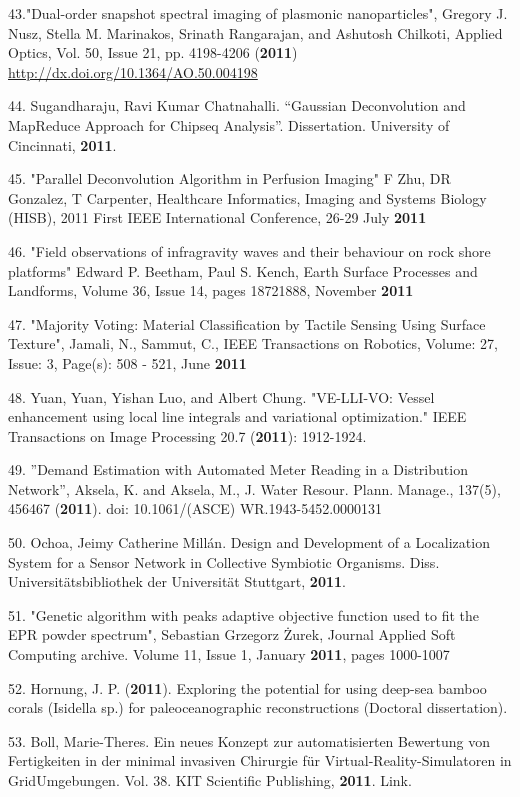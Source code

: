 43."Dual-order snapshot spectral imaging of plasmonic nanoparticles", Gregory J. Nusz, Stella M. Marinakos, Srinath Rangarajan, and Ashutosh Chilkoti, Applied Optics, Vol. 50, Issue 21, pp. 4198-4206 (\textbf{2011}) \url{http://dx.doi.org/10.1364/AO.50.004198}

44. Sugandharaju, Ravi Kumar Chatnahalli. ``Gaussian Deconvolution and MapReduce Approach for Chipseq Analysis''. Dissertation. University of Cincinnati, \textbf{2011}.

45. "Parallel Deconvolution Algorithm in Perfusion Imaging" F Zhu, DR Gonzalez, T Carpenter, Healthcare Informatics, Imaging and Systems Biology (HISB), 2011 First IEEE International Conference, 26-29 July \textbf{2011}

46. "Field observations of infragravity waves and their behaviour on rock shore platforms" Edward P. Beetham, Paul S. Kench, Earth Surface Processes and Landforms, Volume 36, Issue 14, pages 1872\textendash{}1888, November \textbf{2011}

47. "Majority Voting: Material Classification by Tactile Sensing Using Surface Texture", Jamali, N., Sammut, C., IEEE Transactions on Robotics, Volume: 27, Issue: 3, Page(s): 508 - 521, June \textbf{2011}

48. Yuan, Yuan, Yishan Luo, and Albert Chung. "VE-LLI-VO: Vessel enhancement using local line integrals and variational optimization." IEEE Transactions on Image Processing 20.7 (\textbf{2011}): 1912-1924.

49. ''Demand Estimation with Automated Meter Reading in a Distribution Network'', Aksela, K. and Aksela, M., J. Water Resour. Plann. Manage., 137(5), 456\textendash{}467 (\textbf{2011}). doi: 10.1061/(ASCE) WR.1943-5452.0000131

50. Ochoa, Jeimy Catherine Mill\'{a}n. Design and Development of a Localization System for a Sensor Network in Collective Symbiotic Organisms. Diss. Universit\"{a}tsbibliothek der Universit\"{a}t Stuttgart, \textbf{2011}.

51. "Genetic algorithm with peaks adaptive objective function used to fit the EPR powder spectrum", Sebastian Grzegorz \.{Z}urek, Journal Applied Soft Computing archive. Volume 11, Issue 1, January \textbf{2011}, pages 1000-1007

52. Hornung, J. P. (\textbf{2011}). Exploring the potential for using deep-sea bamboo corals (Isidella sp.) for paleoceanographic reconstructions (Doctoral dissertation).

53. Boll, Marie-Theres. Ein neues Konzept zur automatisierten Bewertung von Fertigkeiten in der minimal invasiven Chirurgie f\"{u}r Virtual-Reality-Simulatoren in GridUmgebungen. Vol. 38. KIT Scientific Publishing, \textbf{2011}. Link.

